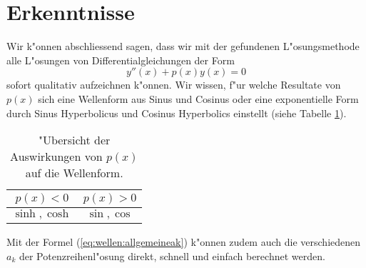 \section{Erkenntnisse}
Wir k"onnen abschliessend sagen, dass wir mit der gefundenen L"osungsmethode 
alle L"osungen von Differentialgleichungen der Form 
\begin{equation*}
	y''(x)+p(x)y(x) = 0
\end{equation*}
sofort qualitativ aufzeichnen k"onnen. Wir wissen, f"ur welche Resultate von 
$p(x)$ sich eine Wellenform aus Sinus und Cosinus oder eine exponentielle Form 
durch Sinus Hyperbolicus und Cosinus Hyperbolics einstellt (siehe Tabelle 
\ref{tab:wellen:formoverview}).
\begin{table}
	\centering
	\begin{tabular}{ c | c }
		$p(x) < 0$ & $p(x) > 0$ \\\hline
		$\sinh, \cosh$ & $\sin, \cos$
	\end{tabular}
	\caption{"Ubersicht der Auswirkungen von $p(x)$ auf die Wellenform.}
	\label{tab:wellen:formoverview}
\end{table}
Mit der Formel (\ref{eq:wellen:allgemeineak}) k"onnen zudem auch die 
verschiedenen $a_k$ der Potenzreihenl"osung direkt, schnell und einfach 
berechnet werden.
